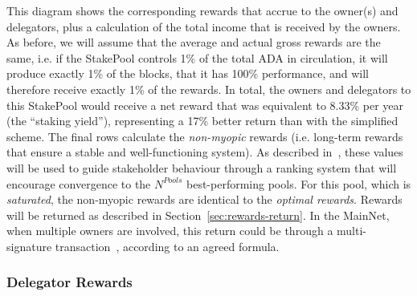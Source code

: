 \documentclass[11pt,a4paper,dvipsnames,twosided,final]{article}
\newcommand{\khcomment}[1]{\todo[color=blue!20]{KH: #1}}
\newcommand{\ada}{ADA{}}
\begin{document}
\noindent
This diagram shows the corresponding rewards that accrue to the owner(s) and delegators,
plus a calculation of the total income that is received by the owners.  As before, we will assume that the average
and actual gross rewards are the same, i.e. if the StakePool controls 1\% of the total \ada{} in
circulation, it will produce exactly 1\% of the blocks, that it has 100\% performance, and will therefore receive exactly 1\% of the rewards.
In total, the
owners and delegators to this StakePool would receive a net reward that was equivalent to 8.33\% per year
(the ``staking yield''), representing a 17\% better return than with the simplified scheme.
The final rows calculate the \emph{non-myopic} rewards (i.e. long-term rewards that ensure
a stable and well-functioning system).  As described in~\cite{delegation_design}, these values will be used to guide stakeholder behaviour
through a ranking system that will encourage convergence to the $N^{\textit{Pools}}$ best-performing pools.
For this pool, which is \emph{saturated}, the non-myopic rewards are identical to the \emph{optimal rewards}.
\khcomment{Is this always the case?}
Rewards will be returned as described in Section~\ref{sec:rewards-return}.  In the MainNet, when multiple
owners are involved, this return could be through a multi-signature transaction~\cite{shelley_multisig}, according to an agreed
formula.

\subsubsection*{Delegator Rewards}
\end{document}
